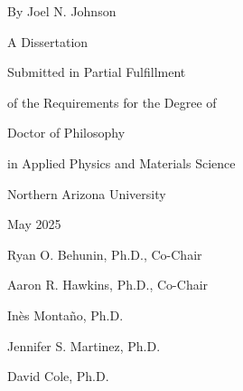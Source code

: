 \begin{centering}
\begin{large}
\begin{spacing}{1.8}

\vspace*{\baselineskip}

\dissertationTitle{}

\thispagestyle{empty} %

\vspace{\baselineskip}

By Joel N. Johnson

\vspace{10mm}

A Dissertation

Submitted in Partial Fulfillment

of the Requirements for the Degree of

\vspace{10mm}

Doctor of Philosophy

in Applied Physics and Materials Science

\vspace{\baselineskip}

Northern Arizona University

May 2025

\vspace{2\baselineskip}


Ryan O. Behunin, Ph.D., Co-Chair

Aaron R. Hawkins, Ph.D., Co-Chair

Inès Montaño, Ph.D.

Jennifer S. Martinez, Ph.D.

David Cole, Ph.D.

\end{spacing}
\end{large}
\end{centering}
